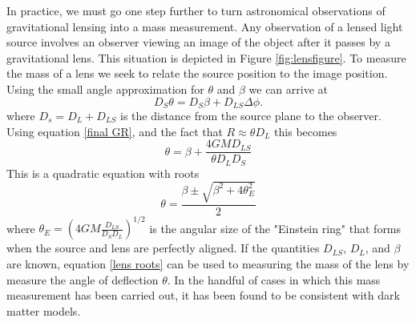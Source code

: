 \documentclass[a4paper,12pt]{article}
\begin{document}
In practice, we must go one step further to turn astronomical observations of gravitational lensing into a mass measurement.  Any observation of a lensed light source involves an observer viewing an image of the object after it passes by a gravitational lens.  This situation is depicted in Figure \ref{fig:lensfigure}. To measure the mass of a lens we seek to relate the source position to the image position. Using the small angle approximation for $\theta$ and $\beta$ we can arrive at
\begin{equation} \label{lens eq 1}
D_S \theta = D_S\beta + D_{LS} \Delta \phi.
\end{equation}
where $D_s=D_L+D_{LS}$ is the distance from the source plane to the observer.  Using equation \ref{final GR}, and the fact that $R \approx \theta D_L$ this becomes
\begin{equation} \label{lens eq 2}
\theta = \beta + \frac{4GM D_{LS}}{\theta D_L D_S}
\end{equation}
This is a quadratic equation with roots
\begin{equation} \label{lens roots}
\theta = \frac{ \beta \pm \sqrt{ \beta^2 + 4 \theta^2_E}}{2}
\end{equation}
where $\theta_E = \left(4GM \frac{D_{LS}}{D_S D_L} \right)^{1/2}$ is the angular size of the "Einstein ring" that forms when the source and lens are perfectly aligned.  If the quantities $D_{LS}$, $D_L$, and $\beta$ are known, equation \ref{lens roots} can be used to measuring the mass of the lens by measure the angle of deflection $\theta$. \cite{Bin-Nun} In the handful of cases in which this mass measurement has been carried out, it has been found to be consistent with dark matter models. \cite{Wu} %
\end{document}
